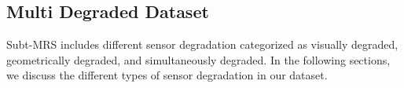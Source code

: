 \documentclass[10pt,twocolumn,letterpaper]{article}
\begin{document}








\subsection{Multi Degraded Dataset}

Subt-MRS includes different sensor degradation categorized as visually degraded, geometrically degraded, and simultaneously degraded.
In the following sections, we discuss the different types of sensor degradation in our dataset.
\end{document}
